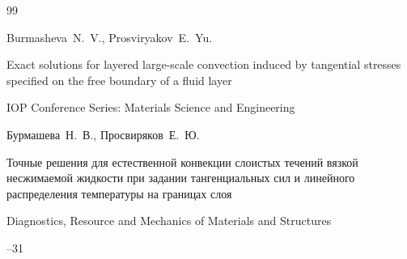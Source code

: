 \begin{thebibliography}{99}

\by Burmasheva~N.~V.,  Prosviryakov~E.~Yu.

\paper Exact solutions for layered large-scale convection induced by tangential stresses specified on the free boundary of a fluid layer

\jour IOP Conference Series: Materials Science and Engineering





 




\by Бурмашева~Н.~В., Просвиряков~Е.~Ю.

\paper Точные решения для естественной конвекции слоистых течений вязкой несжимаемой жидкости при задании тангенциальных сил и линейного распределения температуры на границах слоя

\jour Diagnostics, Resource and Mechanics of Materials and Structures



--31



















\end{thebibliography}
